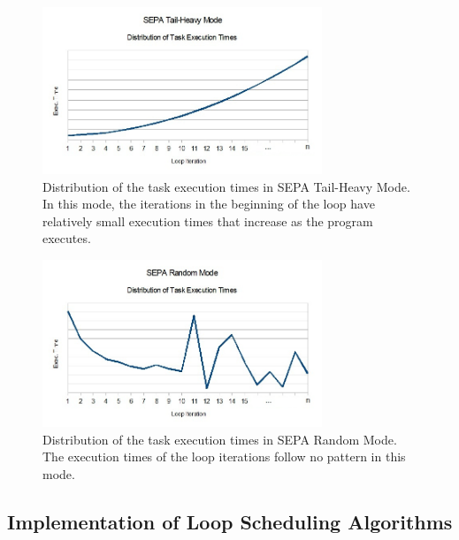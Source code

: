 \documentclass[10pt, twocolumn, letterpaper]{article}
\begin{document}
\begin{figure}[h]
\begin{center}  
  \includegraphics[height=50mm]{graphs/exectime/tail-heavymode.jpg}
  \caption{Distribution of the task execution times in SEPA Tail-Heavy Mode. In this mode, the iterations in the beginning of the loop have relatively small execution times that increase as the program executes.}
\end{center}
\end{figure}


\begin{figure}[h]
\begin{center}  
  \includegraphics[height=50mm]{graphs/exectime/randommode.jpg}
  \caption{Distribution of the task execution times in SEPA Random Mode. The execution times of the loop iterations follow no pattern in this mode.}
\end{center}
\end{figure}

\subsection{Implementation of Loop Scheduling Algorithms}
\end{document}

